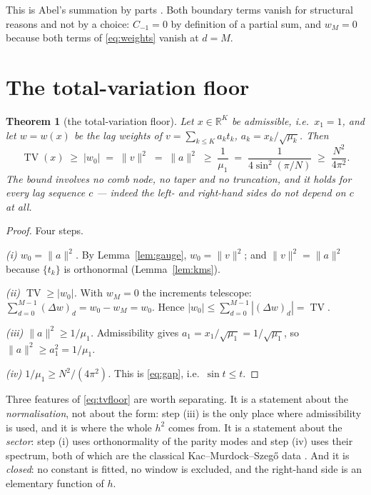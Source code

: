 \documentclass[11pt,a4paper]{article}
\theoremstyle{plain}
\newtheorem{theorem}{Theorem}[section]
\theoremstyle{definition}
\newcommand{\R}{\mathbb{R}}
\newcommand{\TV}{\operatorname{TV}}
\begin{document}
This is Abel's summation by parts \cite{Abel1826}. Both boundary terms vanish
for structural reasons and not by a choice: $C_{-1}=0$ by definition of a
partial sum, and $w_M=0$ because both terms of \eqref{eq:weights} vanish at
$d=M$.

\section{The total-variation floor}
\label{sec:tvfloor}

\begin{theorem}[the total-variation floor]
\label{thm:tvfloor}
Let $x\in\R^{K}$ be admissible, i.e.\ $x_1=1$, and let $w=w(x)$ be the lag
weights of $v=\sum_{k\le K}a_kt_k$, $a_k=x_k/\sqrt{\mu_k}$. Then
\begin{equation}
\label{eq:tvfloor}
  \TV(x)\;\ge\;|w_0|\;=\;\lVert v\rVert^{2}\;=\;\lVert a\rVert^{2}
  \;\ge\;\frac1{\mu_1}\;=\;\frac1{4\sin^{2}(\pi/N)}
  \;\ge\;\frac{N^{2}}{4\pi^{2}} .
\end{equation}
The bound involves no comb node, no taper and no truncation, and it holds for
every lag sequence $c$ --- indeed the left- and right-hand sides do not depend
on $c$ at all.
\end{theorem}

\begin{proof}
Four steps.

\emph{(i) $w_0=\lVert a\rVert^{2}$.} By Lemma~\ref{lem:gauge},
$w_0=\lVert v\rVert^{2}$; and $\lVert v\rVert^{2}=\lVert a\rVert^{2}$ because
$\{t_k\}$ is orthonormal (Lemma~\ref{lem:kms}).

\emph{(ii) $\TV\ge|w_0|$.} With $w_M=0$ the increments telescope:
$\sum_{d=0}^{M-1}(\Delta w)_d=w_0-w_M=w_0$. Hence
$|w_0|\le\sum_{d=0}^{M-1}|(\Delta w)_d|=\TV$.

\emph{(iii) $\lVert a\rVert^{2}\ge1/\mu_1$.} Admissibility gives
$a_1=x_1/\sqrt{\mu_1}=1/\sqrt{\mu_1}$, so
$\lVert a\rVert^{2}\ge a_1^{2}=1/\mu_1$.

\emph{(iv) $1/\mu_1\ge N^{2}/(4\pi^{2})$.} This is \eqref{eq:gap}, i.e.\
$\sin t\le t$.
\end{proof}

Three features of \eqref{eq:tvfloor} are worth separating. It is a statement
about the \emph{normalisation}, not about the form: step (iii) is the only place
where admissibility is used, and it is where the whole $h^{2}$ comes from. It is
a statement about the \emph{sector}: step (i) uses orthonormality of the parity
modes and step (iv) uses their spectrum, both of which are the classical
Kac--Murdock--Szeg\H{o} data \cite{KMS1953}. And it is \emph{closed}: no
constant is fitted, no window is excluded, and the right-hand side is an
elementary function of $h$.
\end{document}
